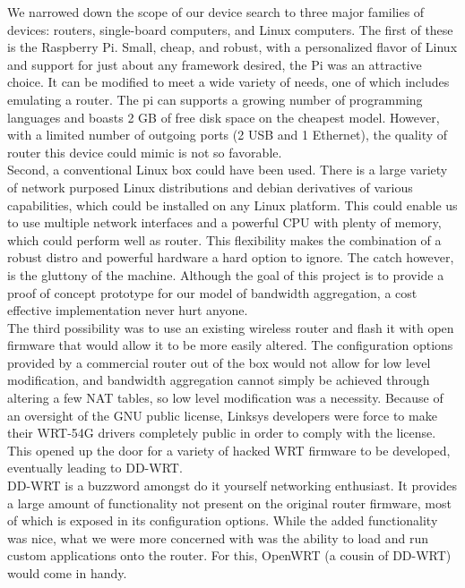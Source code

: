 \documentclass[12pt]{article}
\begin{document}
		We narrowed down the scope of our device search to three major families of devices: routers, single-board computers, and Linux computers. The first of these is the Raspberry Pi. Small, cheap, and robust, with a personalized flavor of Linux and support for just about any framework desired, the Pi was an attractive choice. It can be modified to meet a wide variety of needs, one of which includes emulating a router. The pi can supports a growing number of programming languages and boasts 2 GB of free disk space on the cheapest model. However, with a limited number of outgoing ports (2 USB and 1 Ethernet), the quality of router this device could mimic is not so favorable. \\

		Second, a conventional Linux box could have been used. There is a large variety of network purposed Linux distributions and debian derivatives of various capabilities, which could be installed on any Linux platform. This could enable us to use multiple network interfaces and a powerful CPU with plenty of memory, which could perform well as router. This flexibility makes the combination of a robust distro and powerful hardware a hard option to ignore. The catch however, is the gluttony of the machine. Although the goal of this project is to provide a proof of concept prototype for our model of bandwidth aggregation, a cost effective implementation never hurt anyone. \\

		The third possibility was to use an existing wireless router and flash it with open firmware that would allow it to be more easily altered. The configuration options provided by a commercial router out of the box would not allow for low level modification, and bandwidth aggregation cannot simply be achieved through altering a few NAT tables, so low level modification was a necessity. Because of an oversight of the GNU public license, Linksys developers were force to make their WRT-54G drivers completely public in order to comply with the license. This opened up the door for a variety of hacked WRT firmware to be developed, eventually leading to DD-WRT. \\

		DD-WRT is a buzzword amongst do it yourself networking enthusiast. It provides a large amount of functionality not present on the original router firmware, most of which is exposed in its configuration options. While the added functionality was nice, what we were more concerned with was the ability to load and run custom applications onto the router. For this, OpenWRT (a cousin of DD-WRT) would come in handy. \\
\end{document}
